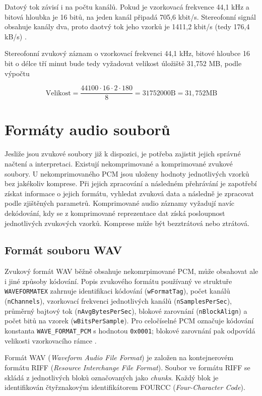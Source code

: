 Datový tok závisí i na počtu kanálů. Pokud je vzorkovacá frekvence 44,1 kHz a bitová hloubka je 16 bitů, na jeden kanál připadá 705,6 kbit/s. Stereofonní signál obsahuje kanály dva, proto daotvý tok jeho vzorků je 1411,2 kbit/s (tedy 176,4 kB/s) \cite[s.~181]{katz2005embedded}. 

Stereofonní zvukový záznam o vzorkovací frekvenci 44,1 kHz, bitové hloubce 16 bit o délce tří minut bude tedy vyžadovat velikost úložiště 31,752 MB, podle výpočtu

\begin{equation}
    \text{Velikost} = \frac{44100 \cdot 16 \cdot 2 \cdot 180}{8} = 31752000 \text{B} = 31,752 \text{MB}
\end{equation}



\section{Formáty audio souborů}
Jesliže jsou zvukové soubory již k dispozici, je potřeba zajistit jejich správné načtení a interpretaci. Existují nekomprimované a komprimované zvukové soubory. U nekomprimovaného PCM jsou uloženy hodnoty jednotlivých vzorků bez jakékoliv komprese. Při jejich zpracování a následném přehrávání je zapotřebí získat informace o jejich formátu, vyhledat zvuková data a následně je zpracovat podle zjištěných parametrů. Komprimované audio záznamy vyžadují navíc dekódování, kdy se z komprimované reprezentace dat získá posloupnost jednotlivých zvukových vzorků. Komprese může být bezztrátová nebo ztrátová.

\subsection{Formát souboru WAV}

Zvukový formát WAV běžně obsahuje nekomrpimované PCM, může obsahovat ale i jiné způsoby kódování. Popis zvukového formátu používaný ve struktuře \texttt{WAVEFORMATEX} zahrnuje identifikaci kódování (\texttt{wFormatTag}), počet kanálů (\texttt{nChannels}), vzorkovací frekvenci jednotlivých kanálů (\texttt{nSamplesPerSec}), průměrný bajtový tok (\texttt{nAvgBytesPerSec}), blokové zarovnání (\texttt{nBlockAlign}) a počet bitů na vzorek (\texttt{wBitsPerSample}). Pro celočíselné PCM označuje kódování konstanta \texttt{WAVE\_FORMAT\_PCM} s hodnotou \texttt{0x0001}; blokové zarovnání pak odpovídá velikosti vzorkovacího rámce \cite{microsoft_waveformatex}.


Formát WAV (\textit{Waveform Audio File Format}) je založen na kontejnerovém
formátu RIFF (\textit{Resource Interchange File Format}). Soubor ve formátu
RIFF se skládá z jednotlivých bloků označovaných jako \textit{chunks}.
Každý blok je identifikován čtyřznakovým identifikátorem FOURCC
(\textit{Four-Character Code}).

